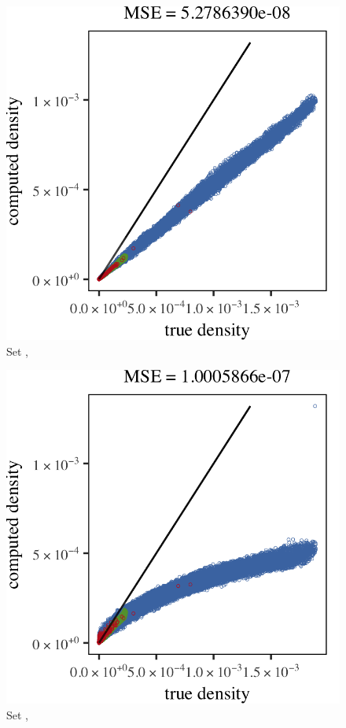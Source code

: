 
\begin{subfigure}{0.23\textwidth}
	\centering
	\includegraphics[keepaspectratio=true, width=\textwidth, height=0.23\textheight]{4/img/all/results_ferdosi_2_60000_mbe_silverman}
	\caption{Set \ferdosiTwo, \mbe}
	\label{fig:4:results:mbe:ferdosi2}
\end{subfigure}
\begin{subfigure}{0.23\textwidth}
	\centering
	\includegraphics[keepaspectratio=true, width=\textwidth, height=0.23\textheight]{4/img/all/results_ferdosi_2_60000_sambe_silverman}
	\caption{Set \ferdosiTwo, \sambe}
	\label{fig:4:results:sambe:ferdosi2}
\end{subfigure}
